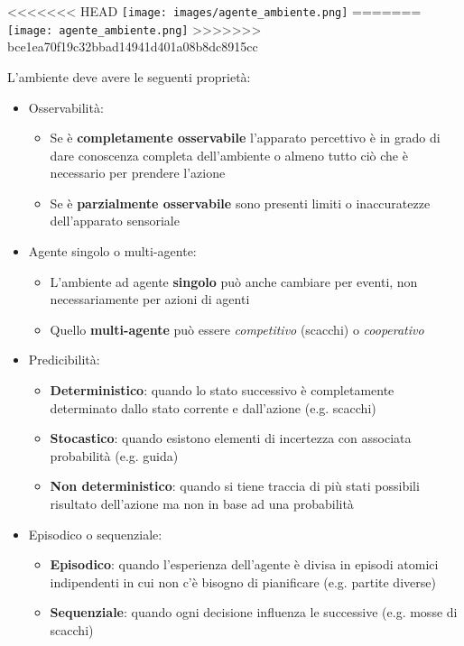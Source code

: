 \begin{center}
<<<<<<< HEAD
	\texttt{[image: images/agente\_ambiente.png]}
=======
	\texttt{[image: agente\_ambiente.png]}
>>>>>>> bce1ea70f19c32bbad14941d401a08b8dc8915cc
\end{center}

L'ambiente deve avere le seguenti proprietà:
\begin{itemize}
	\item Osservabilità:
	\begin{itemize}
		\item Se è \textbf{completamente osservabile} l'apparato percettivo è in grado di dare conoscenza completa dell'ambiente o almeno tutto ciò che è necessario per prendere l'azione
		\item Se è \textbf{parzialmente osservabile} sono presenti limiti o inaccuratezze dell'apparato sensoriale
	\end{itemize}
	\item Agente singolo o multi-agente:
	\begin{itemize}
		\item L'ambiente ad agente \textbf{singolo} può anche cambiare per eventi, non
		necessariamente per azioni di agenti
		\item Quello \textbf{multi-agente} può essere \emph{competitivo} (scacchi) o \emph{cooperativo}
	\end{itemize}
	\item Predicibilità:
	\begin{itemize}
		\item \textbf{Deterministico}: quando lo stato successivo è completamente determinato dallo stato corrente e dall’azione (e.g. scacchi)
		\item \textbf{Stocastico}: quando esistono elementi di incertezza con associata probabilità (e.g. guida)
		\item \textbf{Non deterministico}: quando si tiene traccia di più stati possibili risultato dell’azione ma non in base ad una probabilità
	\end{itemize}
	\item Episodico o sequenziale:
	\begin{itemize}
		\item \textbf{Episodico}: quando l’esperienza dell’agente è divisa in episodi atomici
		indipendenti in cui non c'è bisogno di pianificare (e.g. partite diverse)
		\item \textbf{Sequenziale}: quando ogni decisione influenza le successive (e.g. mosse di scacchi)

\end{itemize}
\end{itemize}
